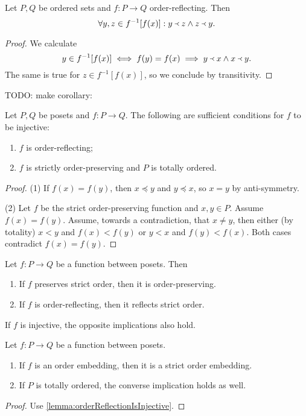\begin{lemma}
Let $P,Q$ be ordered sets and $f: P\to Q$ order-reflecting. Then
\[ \forall y,z \in f^{-1}[f(x)]: y\Yleft z \land z\Yleft y. \]
\end{lemma}
\begin{proof}
We calculate
\[ y\in f^{-1}[f(x)] \iff f(y) = f(x) \implies y\Yleft x \land x\Yleft y. \]
The same is true for $z \in f^{-1}[f(x)]$, so we conclude by transitivity.
\end{proof}
TODO: make corollary:
\begin{lemma} \label{lemma:orderReflectionIsInjective} \label{lemma:strictOrderPreservationIsInjective}
Let $P,Q$ be posets and $f: P\to Q$. The following are sufficient conditions for $f$ to be injective:
\begin{enumerate}
\item $f$ is order-reflecting;
\item $f$ is strictly order-preserving and $P$ is totally ordered.
\end{enumerate}
\end{lemma}
\begin{proof}
(1) If $f(x) = f(y)$, then $x\preceq y$ and $y\preceq x$, so $x=y$ by anti-symmetry.

(2) Let $f$ be the strict order-preserving function and $x,y\in P$. Assume $f(x)=f(y)$. Assume, towards a contradiction, that $x\neq y$, then either (by totality) $x< y$ and $f(x) < f(y)$ or $y < x$ and $f(y)<f(x)$. Both cases contradict $f(x)=f(y)$.
\end{proof}

\begin{lemma}
Let $f:P\to Q$ be a function between posets. Then
\begin{enumerate}
\item If $f$ preserves strict order, then it is order-preserving.
\item If $f$ is order-reflecting, then it reflects strict order.
\end{enumerate}
If $f$ is injective, the opposite implications also hold.
\end{lemma}
\begin{corollary}
Let $f: P\to Q$ be a function between posets.
\begin{enumerate}
\item If $f$ is an order embedding, then it is a strict order embedding.
\item If $P$ is totally ordered, the converse implication holds as well.
\end{enumerate}
\end{corollary}
\begin{proof}
Use \ref{lemma:orderReflectionIsInjective}.
\end{proof}

